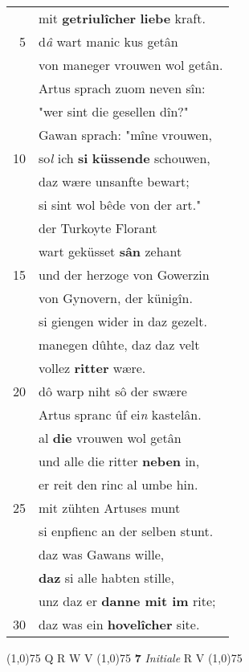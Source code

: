 \documentclass[8pt,a4paper,notitlepage]{article}
\begin{document}
\begin{table}[ht]
\begin{minipage}[t]{0.5\linewidth}
\begin{tabular}{rl}
 & mit \textbf{getriulîcher} \textbf{liebe} kraft.\\ 
5 & d\textit{â} wart manic kus getân\\ 
 & von maneger vrouwen wol getân.\\ 
 & Artus sprach zuom neven sîn:\\ 
 & "wer sint die gesellen dîn?"\\ 
 & Gawan sprach: "mîne vrouwen,\\ 
10 & so\textit{l} ich \textbf{si} \textbf{küssende} schouwen,\\ 
 & daz wære unsanfte bewart;\\ 
 & si sint wol bêde von der art."\\ 
 & der Turkoyte Florant\\ 
 & wart geküsset \textbf{sân} zehant\\ 
15 & und der herzoge von Gowerzin\\ 
 & von Gynovern, der künigîn.\\ 
 & si giengen wider in daz gezelt.\\ 
 & manegen dûhte, daz daz velt\\ 
 & vollez \textbf{ritter} wære.\\ 
20 & dô warp niht sô der swære\\ 
 & Artus spranc ûf ei\textit{n} kastelân.\\ 
 & al \textbf{die} vrouwen wol getân\\ 
 & und alle die ritter \textbf{neben} in,\\ 
 & er reit den rinc al umbe hin.\\ 
25 & mit zühten Artuses munt\\ 
 & si enpfienc an der selben stunt.\\ 
 & daz was Gawans wille,\\ 
 & \textbf{daz} si alle habten stille,\\ 
 & unz daz er \textbf{danne mit im} rite;\\ 
30 & daz was ein \textbf{hovelîcher} site.\\ 
\end{tabular}
\scriptsize
\line(1,0){75} \newline
Q R W V \newline
\line(1,0){75} \newline
\textbf{7} \textit{Initiale} R V  \newline
\line(1,0){75} \newline

\end{minipage}
\end{table}
\end{document}
